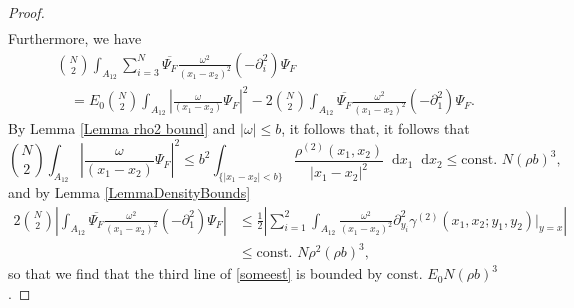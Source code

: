 \documentclass[a4paper,11pt]{article}
\newcommand{\abs}[1]{\left\lvert #1 \right\rvert}
\newcommand*\diff{\mathop{}\!\mathrm{d}}
\numberwithin{equation}{section}
\begin{document}
\begin{proof}
\begin{equation}
\begin{aligned}
			\end{aligned}
		\end{equation}
		Furthermore, we have \begin{equation}
			\begin{aligned}
				&\binom{N}{2}\int_{A_{12}}\sum_{i=3}^{N} \overline{\Psi_F}\frac{\omega^2}{(x_1-x_2)^2}(-\partial^2_i)\Psi_F\\&\quad=E_0\binom{N}{2}\int_{A_{12}}\left\lvert\frac{\omega}{(x_1-x_2)}\Psi_F\right\rvert^2-2\binom{N}{2}\int_{A_{12}} \overline{\Psi_F}\frac{\omega^2}{(x_1-x_2)^2}(-\partial^2_1)\Psi_F.
			\end{aligned}
		\end{equation}
		By Lemma \ref{Lemma rho2 bound} and $\abs{\omega}\leq b$, it follows that, it follows that
		\begin{equation}
			\binom{N}{2}\int_{A_{12}}\left\lvert\frac{\omega}{(x_1-x_2)}\Psi_F\right\rvert^2\leq b^2\int_{\{\abs{x_1-x_2}<b\}} \frac{\rho^{(2)}(x_1,x_2)}{\abs{x_1-x_2}^2}\diff x_1\diff x_2\leq \text{const. }N(\rho b)^3,
		\end{equation}
		and by Lemma \ref{LemmaDensityBounds} \begin{equation}
			\begin{aligned}
				2\binom{N}{2}\abs{\int_{A_{12}} \overline{\Psi_F}\frac{\omega^2}{(x_1-x_2)^2}(-\partial^2_1)\Psi_F}&\leq\frac12\abs{\sum_{i=1}^{2}\int_{A_{12}}\frac{\omega^2}{(x_1-x_2)^2}\partial^2_{y_i}\gamma^{(2)}(x_1,x_2;y_1,y_2)\Big\rvert_{y=x}}\\&\leq \text{const. } N\rho^2(\rho b)^3,
			\end{aligned}
		\end{equation}
		so that we find that the third line of \eqref{someest} is bounded by $\text{const. }E_0 N(\rho b)^3$.
		

\end{proof}
\end{document}

